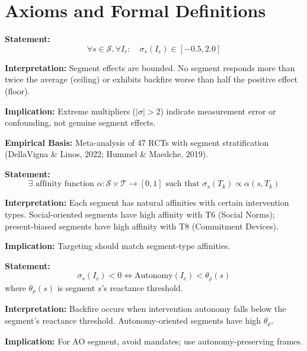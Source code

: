 \section{Axioms and Formal Definitions}
\label{sec:qq-axioms}

\begin{tcolorbox}[colback=gray!5!white, colframe=gray!75!black,
    title=Axiom QQ-1: Multiplier Bounds]
\textbf{Statement:}
\begin{equation}
\forall s \in \mathcal{S}, \forall I_c: \quad \sigma_s(I_c) \in [-0.5, 2.0]
\end{equation}

\textbf{Interpretation:} Segment effects are bounded. No segment responds more than
twice the average (ceiling) or exhibits backfire worse than half the positive effect (floor).

\textbf{Implication:} Extreme multipliers ($|\sigma| > 2$) indicate measurement error
or confounding, not genuine segment effects.

\textbf{Empirical Basis:} Meta-analysis of 47 RCTs with segment stratification
(DellaVigna \& Linos, 2022; Hummel \& Maedche, 2019).
\end{tcolorbox}

\begin{tcolorbox}[colback=gray!5!white, colframe=gray!75!black,
    title=Axiom QQ-2: Segment-Type Affinity]
\textbf{Statement:}
\begin{equation}
\exists \text{ affinity function } \alpha: \mathcal{S} \times \mathcal{T} \rightarrow [0, 1]
\text{ such that } \sigma_s(T_k) \propto \alpha(s, T_k)
\end{equation}

\textbf{Interpretation:} Each segment has natural affinities with certain intervention
types. Social-oriented segments have high affinity with T6 (Social Norms);
present-biased segments have high affinity with T8 (Commitment Devices).

\textbf{Implication:} Targeting should match segment-type affinities.
\end{tcolorbox}

\begin{tcolorbox}[colback=gray!5!white, colframe=gray!75!black,
    title=Axiom QQ-3: Reactance Threshold]
\textbf{Statement:}
\begin{equation}
\sigma_s(I_c) < 0 \iff \text{Autonomy}(I_c) < \theta_{\rho}(s)
\end{equation}
where $\theta_{\rho}(s)$ is segment $s$'s reactance threshold.

\textbf{Interpretation:} Backfire occurs when intervention autonomy falls below
the segment's reactance threshold. Autonomy-oriented segments have high $\theta_{\rho}$.

\textbf{Implication:} For AO segment, avoid mandates; use autonomy-preserving frames.
\end{tcolorbox}

